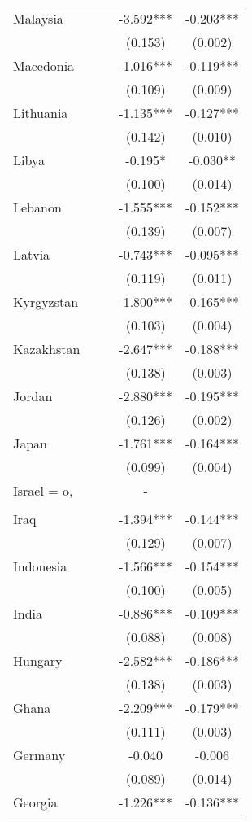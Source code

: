 \documentclass[]{article}
\begin{document}
\begin{tabular}{lcccc}
Malaysia &  &  & -3.592*** & -0.203*** \\
 &  &  & (0.153) & (0.002) \\
Macedonia &  &  & -1.016*** & -0.119*** \\
 &  &  & (0.109) & (0.009) \\
Lithuania &  &  & -1.135*** & -0.127*** \\
 &  &  & (0.142) & (0.010) \\
Libya &  &  & -0.195* & -0.030** \\
 &  &  & (0.100) & (0.014) \\
Lebanon &  &  & -1.555*** & -0.152*** \\
 &  &  & (0.139) & (0.007) \\
Latvia &  &  & -0.743*** & -0.095*** \\
 &  &  & (0.119) & (0.011) \\
Kyrgyzstan &  &  & -1.800*** & -0.165*** \\
 &  &  & (0.103) & (0.004) \\
Kazakhstan &  &  & -2.647*** & -0.188*** \\
 &  &  & (0.138) & (0.003) \\
Jordan &  &  & -2.880*** & -0.195*** \\
 &  &  & (0.126) & (0.002) \\
Japan &  &  & -1.761*** & -0.164*** \\
 &  &  & (0.099) & (0.004) \\
Israel = o, &  &  & - &  \\
 &  &  &  &  \\
Iraq &  &  & -1.394*** & -0.144*** \\
 &  &  & (0.129) & (0.007) \\
Indonesia &  &  & -1.566*** & -0.154*** \\
 &  &  & (0.100) & (0.005) \\
India &  &  & -0.886*** & -0.109*** \\
 &  &  & (0.088) & (0.008) \\
Hungary &  &  & -2.582*** & -0.186*** \\
 &  &  & (0.138) & (0.003) \\
Ghana &  &  & -2.209*** & -0.179*** \\
 &  &  & (0.111) & (0.003) \\
Germany &  &  & -0.040 & -0.006 \\
 &  &  & (0.089) & (0.014) \\
Georgia &  &  & -1.226*** & -0.136*** \\

\end{tabular}
\end{document}
